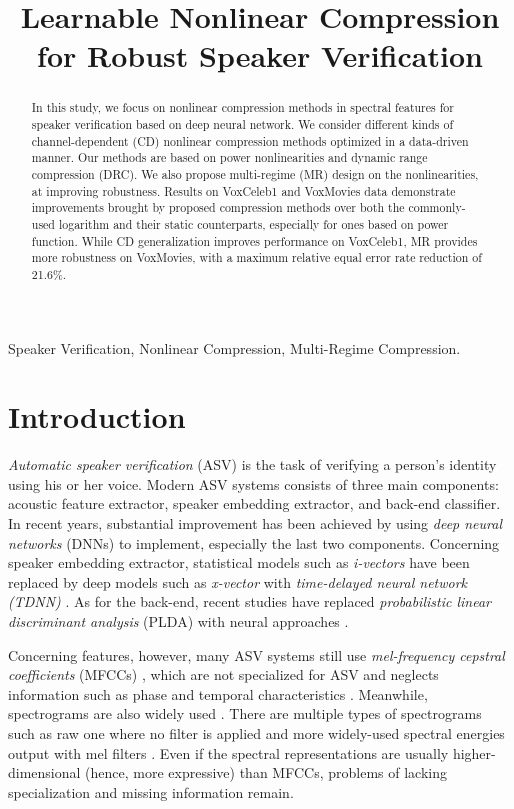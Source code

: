 \documentclass{article}
\title{Learnable Nonlinear Compression for Robust Speaker Verification}
\begin{document}
\ninept
%
\maketitle
%
\begin{abstract}
In this study, we focus on nonlinear compression methods in spectral features for speaker verification based on deep neural network. We consider different kinds of channel-dependent (CD) nonlinear compression methods optimized in a data-driven manner. Our methods are based on power nonlinearities and dynamic range compression (DRC). We also propose multi-regime (MR) design on the nonlinearities, at improving robustness. Results on VoxCeleb1 and VoxMovies data demonstrate improvements brought by proposed compression methods over both the commonly-used logarithm and their static counterparts, especially for ones based on power function. While CD generalization improves performance on VoxCeleb1, MR provides more robustness on VoxMovies, with a maximum relative equal error rate reduction of 21.6\%.
\end{abstract}
%
\begin{keywords}
Speaker Verification, Nonlinear Compression, Multi-Regime Compression.
\end{keywords}
%
\section{Introduction}
\label{sec:intro}

\emph{Automatic speaker verification} (ASV) \cite{asv2015, dnn_asv2021} is the task of verifying a person's identity using his or her voice. Modern ASV systems consists of three main components: acoustic feature extractor, speaker embedding extractor, and back-end classifier. In recent years, substantial improvement has been achieved by using \emph{deep neural networks} (DNNs) to implement, especially the last two components. Concerning speaker embedding extractor, statistical models such as \emph{i-vectors} \cite{ivector} have been replaced by deep models such as \emph{x-vector} with \emph{time-delayed neural network (TDNN)} \cite{xvector2018}. As for the back-end, recent studies have replaced \emph{probabilistic linear discriminant analysis} (PLDA) \cite{plda} with neural approaches \cite{nplda2020}.

Concerning features, however, many ASV systems still use \emph{mel-frequency cepstral coefficients} (MFCCs) \cite{mfcc1980}, which are not specialized for ASV and neglects information such as phase and temporal characteristics \cite{phase1, phase2, cosphase, pncc}. Meanwhile, spectrograms are also widely used \cite{voxceleb1, voiceid, enh_asv1, enh_asv2}. There are multiple types of spectrograms such as raw one where no filter is applied \cite{voxceleb1, voxceleb2} and more widely-used spectral energies output with mel filters \cite{magneto, ecapa}. Even if the spectral representations are usually higher-dimensional (hence, more expressive) than MFCCs, problems of lacking specialization and missing information remain. 
\end{document}
